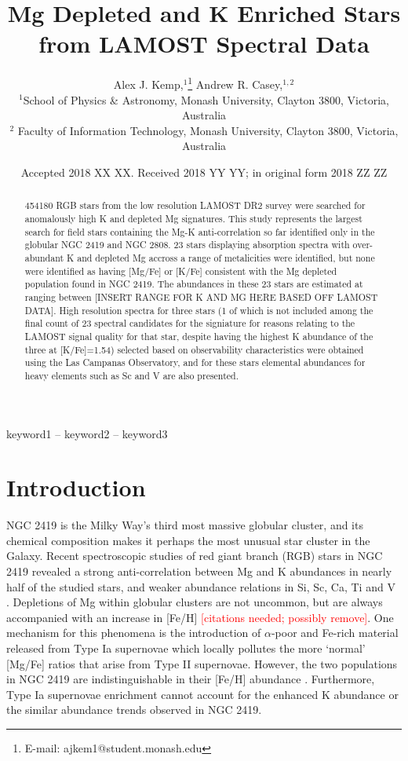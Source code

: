 \documentclass[a4paper,fleqn,usenatbib]{mnras}
\title[Short title, max. 45 characters]{Mg Depleted and K Enriched Stars from LAMOST Spectral Data}
\author[Kemp et al.]{
Alex J. Kemp,$^{1}$\thanks{E-mail: ajkem1@student.monash.edu}
Andrew R. Casey,$^{1,2}$
\\
$^{1}$School of Physics \& Astronomy, Monash University, Clayton 3800, Victoria, Australia\\
$^{2}$ Faculty of Information Technology, Monash University, Clayton 3800, Victoria, Australia\\
}
\date{Accepted 2018 XX XX. Received 2018 YY YY; in original form 2018 ZZ ZZ}
\newcommand{\todo}[1]{\textcolor{red}{#1}}
\begin{document}
\label{firstpage}
\pagerange{\pageref{firstpage}--\pageref{lastpage}}
\maketitle

\begin{abstract}
454180 RGB stars from the low resolution LAMOST DR2 survey were searched for anomalously high K and depleted Mg signatures. This study represents the largest search for field stars containing the Mg-K anti-correlation so far identified only in the globular NGC 2419 and NGC 2808. 23 stars displaying absorption spectra with over-abundant K and depleted Mg accross a range of metalicities were identified, but none were identified as having [Mg/Fe] or [K/Fe] consistent with the Mg depleted population found in NGC 2419. The abundances in these 23 stars are estimated at ranging between [INSERT RANGE FOR K AND MG HERE BASED OFF LAMOST DATA]. High resolution spectra for three stars (1 of which is not included among the final count of 23 spectral candidates for the signiature for reasons relating to the LAMOST signal quality for that star, despite having the highest K abundance of the three at [K/Fe]=1.54) selected based on observability characteristics were obtained using the Las Campanas Observatory, and for these stars elemental abundances for heavy elements such as Sc and V are also presented.
\end{abstract}

\begin{keywords}
keyword1 -- keyword2 -- keyword3
\end{keywords}



\section{Introduction}

NGC 2419 is the Milky Way's third most massive globular cluster, and its chemical composition makes it perhaps the most unusual star cluster in the Galaxy. Recent spectroscopic studies of red giant branch (RGB) stars in NGC 2419 revealed a strong anti-correlation between Mg and K abundances in nearly half of the studied stars, and weaker abundance relations in Si, Sc, Ca, Ti and V \citep{mucciarelli2012,cohenkirby2012}. Depletions of Mg within globular clusters are not uncommon, but are always accompanied with an increase in [Fe/H] \todo{[citations needed; possibly remove]}. One mechanism for this phenomena is the introduction of $\alpha$-poor and Fe-rich material released from Type Ia supernovae which locally pollutes the more `normal' [Mg/Fe] ratios that arise from Type II supernovae. However, the two populations in NGC 2419 are indistinguishable in their [Fe/H] abundance \citep{cohenkirby2012}. Furthermore, Type Ia supernovae enrichment cannot account for the enhanced K abundance or the similar  abundance trends observed in NGC 2419.
\end{document}
